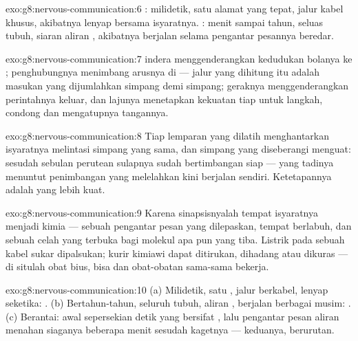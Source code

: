 \begin{solution}{exo:g8:nervous-communication:6}
: milidetik, satu alamat yang tepat, jalur kabel
khusus, akibatnya lenyap bersama isyaratnya. : menit
sampai tahun, seluas tubuh, siaran aliran , akibatnya
berjalan selama pengantar pesannya beredar.
\end{solution}

\begin{solution}{exo:g8:nervous-communication:7}
 indera  menggenderangkan kedudukan bolanya ke
;  penghubungnya menimbang arusnya di
 --- jalur yang dihitung itu adalah masukan yang
dijumlahkan simpang demi simpang;  geraknya
menggenderangkan perintahnya keluar, dan lajunya menetapkan
kekuatan tiap  untuk langkah, condong dan mengatupnya
tangannya.
\end{solution}

\begin{solution}{exo:g8:nervous-communication:8}
Tiap lemparan yang dilatih menghantarkan isyaratnya
melintasi simpang yang sama, dan simpang yang diseberangi
menguat: sesudah sebulan perutean sulapnya sudah bertimbangan
siap --- yang tadinya menuntut penimbangan yang melelahkan
kini berjalan sendiri. Ketetapannya adalah  yang
lebih kuat.
\end{solution}

\begin{solution}{exo:g8:nervous-communication:9}
Karena sinapsisnyalah tempat isyaratnya menjadi kimia ---
sebuah pengantar pesan yang dilepaskan, tempat berlabuh, dan
sebuah celah yang terbuka bagi molekul apa pun yang tiba.
Listrik pada sebuah kabel sukar dipalsukan; kurir kimiawi
dapat ditirukan, dihadang atau dikuras --- di situlah obat
bius, bisa dan obat-obatan sama-sama bekerja.
\end{solution}

\begin{solution}{exo:g8:nervous-communication:10}
(a) Milidetik,  satu , jalur berkabel, lenyap
seketika: . (b) Bertahun-tahun, seluruh tubuh, aliran
, berjalan berbagai musim: . (c) Berantai: awal
sepersekian detik yang bersifat , lalu pengantar pesan
aliran  menahan siaganya beberapa menit sesudah
kagetnya --- keduanya, berurutan.
\end{solution}

